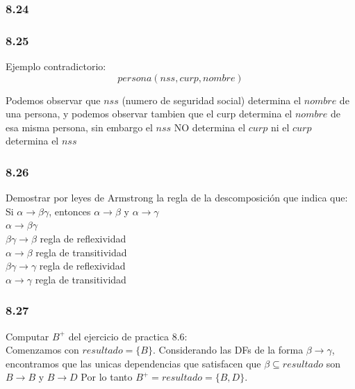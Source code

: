 \documentclass[twoside]{article}
\begin{document}
\subsubsection*{8.24}

\subsubsection*{8.25}

Ejemplo contradictorio:
$$persona(nss, curp, nombre)$$

Podemos observar que $nss$ (numero de seguridad social) determina el $nombre$ de una persona, y podemos observar
tambien que el curp determina el $nombre$ de esa misma persona, sin embargo el $nss$ NO determina el $curp$ ni el
$curp$ determina el $nss$

\subsubsection*{8.26}
Demostrar por leyes de Armstrong la regla de la descomposici\'on que indica que:\\
Si $\alpha \rightarrow \beta \gamma$, entonces $\alpha \rightarrow \beta$ y $\alpha \rightarrow \gamma$\\

$\alpha \rightarrow \beta \gamma$\\
$\beta \gamma \rightarrow \beta$ regla de reflexividad\\
$\alpha \rightarrow \beta$ regla de transitividad\\
$\beta \gamma \rightarrow \gamma$ regla de reflexividad\\
$\alpha \rightarrow \gamma$ regla de transitividad\\
\subsubsection*{8.27}
Computar $B^+$ del ejercicio de practica 8.6:\\
Comenzamos con $resultado = \{B\}$. Considerando las DFs de la forma $\beta \rightarrow \gamma$, encontramos que
las unicas dependencias que satisfacen que $\beta \subseteq resultado$ son $B \rightarrow B$ y $B \rightarrow D$
Por lo tanto $B^+ = resultado = \{B, D\}$.
\end{document}
